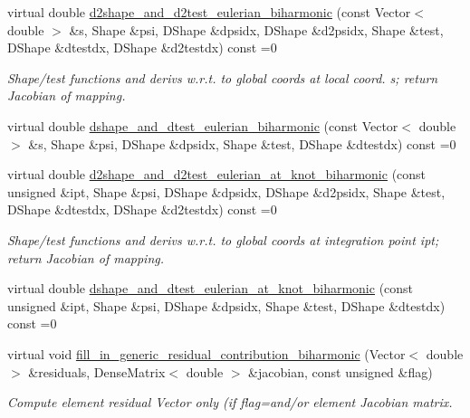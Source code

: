 \begin{DoxyCompactItemize}
virtual double \hyperlink{classoomph_1_1MyBiharmonicEquations_a4597b3938b6f1244d6e8e0f58250c14a}{d2shape\+\_\+and\+\_\+d2test\+\_\+eulerian\+\_\+biharmonic} (const Vector$<$ double $>$ \&s, Shape \&psi, D\+Shape \&dpsidx, D\+Shape \&d2psidx, Shape \&test, D\+Shape \&dtestdx, D\+Shape \&d2testdx) const =0
\begin{DoxyCompactList}\small\item\em Shape/test functions and derivs w.\+r.\+t. to global coords at local coord. s; return Jacobian of mapping. \end{DoxyCompactList}\item 
virtual double \hyperlink{classoomph_1_1MyBiharmonicEquations_a084eaadd62185dad622c7708862f023a}{dshape\+\_\+and\+\_\+dtest\+\_\+eulerian\+\_\+biharmonic} (const Vector$<$ double $>$ \&s, Shape \&psi, D\+Shape \&dpsidx, Shape \&test, D\+Shape \&dtestdx) const =0
\item 
virtual double \hyperlink{classoomph_1_1MyBiharmonicEquations_a85687f39c0fb72f25ce67f5867a83470}{d2shape\+\_\+and\+\_\+d2test\+\_\+eulerian\+\_\+at\+\_\+knot\+\_\+biharmonic} (const unsigned \&ipt, Shape \&psi, D\+Shape \&dpsidx, D\+Shape \&d2psidx, Shape \&test, D\+Shape \&dtestdx, D\+Shape \&d2testdx) const =0
\begin{DoxyCompactList}\small\item\em Shape/test functions and derivs w.\+r.\+t. to global coords at integration point ipt; return Jacobian of mapping. \end{DoxyCompactList}\item 
virtual double \hyperlink{classoomph_1_1MyBiharmonicEquations_a08e45fddb2c25119e6ba826cd6cafdbf}{dshape\+\_\+and\+\_\+dtest\+\_\+eulerian\+\_\+at\+\_\+knot\+\_\+biharmonic} (const unsigned \&ipt, Shape \&psi, D\+Shape \&dpsidx, Shape \&test, D\+Shape \&dtestdx) const =0
\item 
virtual void \hyperlink{classoomph_1_1MyBiharmonicEquations_ab469b058672baa7a5db95ae93ab4d394}{fill\+\_\+in\+\_\+generic\+\_\+residual\+\_\+contribution\+\_\+biharmonic} (Vector$<$ double $>$ \&residuals, Dense\+Matrix$<$ double $>$ \&jacobian, const unsigned \&flag)
\begin{DoxyCompactList}\small\item\em Compute element residual Vector only (if flag=and/or element Jacobian matrix. \end{DoxyCompactList}\end{DoxyCompactItemize}
